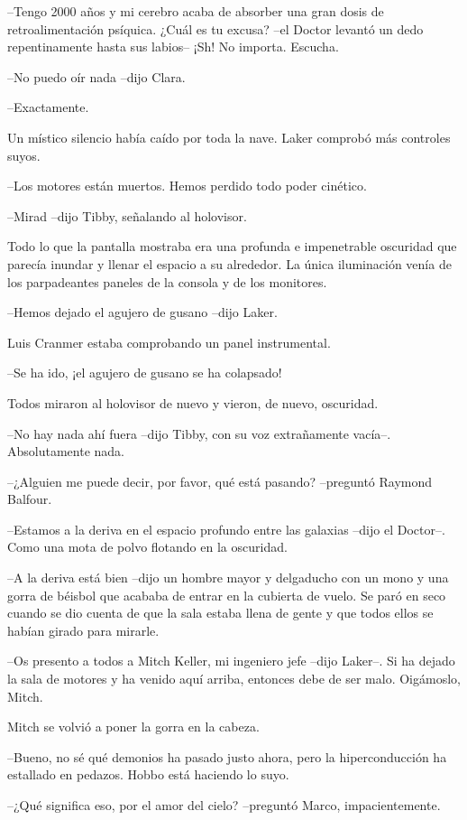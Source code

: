 {--Tengo 2000 años y mi cerebro acaba de absorber una gran dosis de
 retroalimentación psíquica. ¿Cuál es tu excusa? --el Doctor levantó un
dedo repentinamente hasta sus labios-- ¡Sh! No importa. Escucha.}

{--No puedo oír nada --dijo Clara.}

{--Exactamente.}

{Un místico silencio había caído por toda la nave. Laker comprobó más
controles suyos.}

{--Los motores están muertos. Hemos perdido todo poder cinético.}

{--Mirad --dijo Tibby, señalando al holovisor.}

{Todo lo que la pantalla mostraba era una profunda e impenetrable
 oscuridad que parecía inundar y llenar el espacio a su alrededor. La
 única iluminación venía de los parpadeantes paneles de la consola y de
los monitores.}

{--Hemos dejado el agujero de gusano --dijo Laker.}

{Luis Cranmer estaba comprobando un panel instrumental.}

{--Se ha ido, ¡el agujero de gusano se ha colapsado!}

{Todos miraron al holovisor de nuevo y vieron, de nuevo, oscuridad.}

{--No hay nada ahí fuera --dijo Tibby, con su voz extrañamente vacía--.
Absolutamente nada.}

{--¿Alguien me puede decir, por favor, qué está pasando? --preguntó
Raymond Balfour.}

{--Estamos a la deriva en el espacio profundo entre las galaxias --dijo
el Doctor--. Como una mota de polvo flotando en la oscuridad.}

{--A la deriva está bien --dijo un hombre mayor y delgaducho con un mono
 y una gorra de béisbol que acababa de entrar en la cubierta de vuelo. Se
 paró en seco cuando se dio cuenta de que la sala estaba llena de gente y
que todos ellos se habían girado para mirarle.}

{--Os presento a todos a Mitch Keller, mi ingeniero jefe --dijo Laker--.
 Si ha dejado la sala de motores y ha venido aquí arriba, entonces debe
de ser malo. Oigámoslo, Mitch.}

{Mitch se volvió a poner la gorra en la cabeza.}

{--Bueno, no sé qué demonios ha pasado justo ahora, pero la
hiperconducción ha estallado en pedazos. Hobbo está haciendo lo suyo.}

{--¿Qué significa eso, por el amor del cielo? --preguntó Marco,
impacientemente.}

